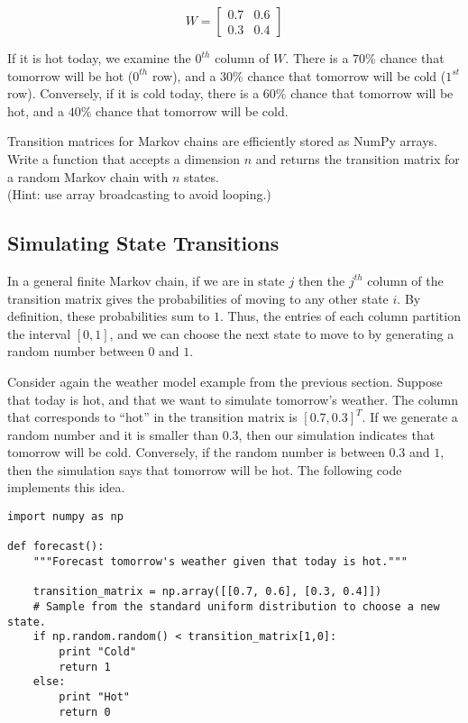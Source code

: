 \[W = \left[\begin{array}{cc}
0.7 & 0.6 \\
0.3 & 0.4 \end{array} \right]\] 


If it is hot today, we examine the $0^{th}$ column of $W$.
There is a $70\%$ chance that tomorrow will be hot ($0^{th}$ row), and a $30\%$ chance that tomorrow will be cold ($1^{st}$ row).
Conversely, if it is cold today, there is a $60\%$ chance that tomorrow will be hot, and a $40\%$ chance that tomorrow will be cold.

\begin{problem} %
Transition matrices for Markov chains are efficiently stored as NumPy arrays.
Write a function that accepts a dimension $n$ and returns the transition matrix for a random Markov chain with $n$ states.
\\
(Hint: use array broadcasting to avoid looping.)
\end{problem}

\subsection*{Simulating State Transitions} %

In a general finite Markov chain, if we are in state $j$ then the $j^{th}$ column of the transition matrix gives the probabilities of moving to any other state $i$.
By definition, these probabilities sum to $1$.
Thus, the entries of each column partition the interval $[0, 1]$, and we can choose the next state to move to by generating a random number between $0$ and $1$.

Consider again the weather model example from the previous section.
Suppose that today is hot, and that we want to simulate tomorrow's weather.
The column that corresponds to ``hot'' in the transition matrix is $[0.7, 0.3]^T$.
If we generate a random number and it is smaller than $0.3$, then our simulation indicates that tomorrow will be cold.
Conversely, if the random number is between $0.3$ and $1$, then the simulation says that tomorrow will be hot.
The following code implements this idea.

\begin{lstlisting}
import numpy as np

def forecast():
	"""Forecast tomorrow's weather given that today is hot."""

	transition_matrix = np.array([[0.7, 0.6], [0.3, 0.4]])
	# Sample from the standard uniform distribution to choose a new state.
	if np.random.random() < transition_matrix[1,0]:
		print "Cold"
		return 1
	else:
		print "Hot"
		return 0
\end{lstlisting}

